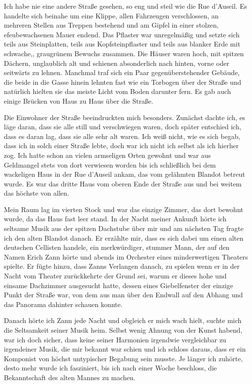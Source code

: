 \documentclass[a4paper]{memoir}
\begin{document}
Ich habe nie eine andere Straße gesehen, so eng und steil wie die Rue d'Auseil. Es handelte sich beinahe um eine Klippe, allen Fahrzeugen verschlossen, an mehreren Stellen aus Treppen bestehend und am Gipfel in einer stolzen, efeubewachsenen Mauer endend. Das Pflaster war unregelmäßig und setzte sich teils aus Steinplatten, teils aus Kopfsteinpflaster und teils aus blanker Erde mit schwache,, graugrünem Bewuchs zusammen. Die Häuser waren hoch, mit spitzen Dächern, unglaublich alt und schienen absonderlich nach hinten, vorne oder seitwärts zu lehnen. Manchmal traf sich ein Paar gegenüberstehender Gebäude, die beide in die Gasse hinein lehnten fast wie ein Torbogen über der Straße und natürlich hielten sie das meiste Licht vom Boden darunter fern. Es gab auch einige Brücken von Haus zu Haus über die Straße.

Die Einwohner der Straße beeindruckten mich besonders. Zunächst dachte ich, es läge daran, dass sie alle still und verschwiegen waren, doch später entschied ich, dass es daran lag, dass sie alle sehr alt waren. Ich weiß nicht, wie es sich begab, dass ich in solch einer Straße lebte, doch war ich nicht ich selbst als ich hierher zog. Ich hatte schon an vielen armseligen Orten gewohnt und war aus Geldmangel stets von dort verwiesen worden bis ich schließlich bei dem wackeligen Haus in der Rue d'Auseil ankam, das vom gelähmten Blandot betreut wurde. Es war das dritte Haus vom oberen Ende der Straße aus und bei weitem das höchste von allen.

Mein Raum lag im vierten Stock und war das einzige Zimmer, das dort bewohnt wurde, da das Haus fast leer stand. In der Nacht meiner Ankunft hörte ich seltsame Musik aus der spitzen Dachstube über mir und am nächsten Tag fragte ich den alten Blandot danach. Er erzählte mir, dass es sich dabei um einen alten deutschen Cellisten handele, ein merkwürdiger, stummer Mann, der auf den Namen Erich Zann hörte und abends im Orchester eines minderwertigen Theaters spielte. Er fügte hinzu, dass Zanns Verlangen danach, zu spielen wenn er in der Nacht vom Theater zurückkehrte der Grund sei, warum er dieses hohe und einsame Dachzimmer ausgesucht hatte, dessen eines Giebelfenster der einzige Punkt der Straße war, von dem aus man über den Endwall auf den Abhang und das Panorama dahinter schauen konnte.

Danach hörte ich Zann jede Nacht und obgleich er mich wach hielt, suchte mich die Seltsamkeit seiner Musik heim. Selbst wenig Ahnung von der Kunst habend, war ich doch sicher, dass keine seiner Harmonien irgendwie vergleichbar  zu irgendeiner Musik, die mir bekannt war schien und ich schloss daraus, dass er ein Komponist von höchst untypischer Begabung sein musste. Je länger ich zuhörte, desto mehr wurde ich fasziniert, bis ich nach einer Woche beschloss, die Bekanntschaft des alten Mannes zu machen.
\end{document}
